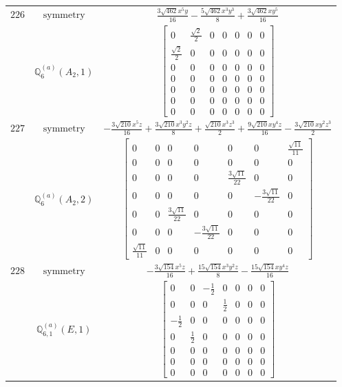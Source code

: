 \documentclass[fleqn,8pt,landscape]{jsarticle}
\begin{document}
\begin{longtable}{ccc}
$ 226 $ & $ \text{symmetry} $ & $ \frac{3 \sqrt{462} x^{5} y}{16} - \frac{5 \sqrt{462} x^{3} y^{3}}{8} + \frac{3 \sqrt{462} x y^{5}}{16} $ \\
$  $ & $ \mathbb{Q}_{6}^{(a)}(A_{2},1) $ & $ \begin{bmatrix} 0 & \frac{\sqrt{2}}{2} & 0 & 0 & 0 & 0 & 0 \\ \frac{\sqrt{2}}{2} & 0 & 0 & 0 & 0 & 0 & 0 \\ 0 & 0 & 0 & 0 & 0 & 0 & 0 \\ 0 & 0 & 0 & 0 & 0 & 0 & 0 \\ 0 & 0 & 0 & 0 & 0 & 0 & 0 \\ 0 & 0 & 0 & 0 & 0 & 0 & 0 \\ 0 & 0 & 0 & 0 & 0 & 0 & 0 \end{bmatrix} $ \\ \hline
$ 227 $ & $ \text{symmetry} $ & $ - \frac{3 \sqrt{210} x^{5} z}{16} + \frac{3 \sqrt{210} x^{3} y^{2} z}{8} + \frac{\sqrt{210} x^{3} z^{3}}{2} + \frac{9 \sqrt{210} x y^{4} z}{16} - \frac{3 \sqrt{210} x y^{2} z^{3}}{2} $ \\
$  $ & $ \mathbb{Q}_{6}^{(a)}(A_{2},2) $ & $ \begin{bmatrix} 0 & 0 & 0 & 0 & 0 & 0 & \frac{\sqrt{11}}{11} \\ 0 & 0 & 0 & 0 & 0 & 0 & 0 \\ 0 & 0 & 0 & 0 & \frac{3 \sqrt{11}}{22} & 0 & 0 \\ 0 & 0 & 0 & 0 & 0 & - \frac{3 \sqrt{11}}{22} & 0 \\ 0 & 0 & \frac{3 \sqrt{11}}{22} & 0 & 0 & 0 & 0 \\ 0 & 0 & 0 & - \frac{3 \sqrt{11}}{22} & 0 & 0 & 0 \\ \frac{\sqrt{11}}{11} & 0 & 0 & 0 & 0 & 0 & 0 \end{bmatrix} $ \\ \hline
$ 228 $ & $ \text{symmetry} $ & $ - \frac{3 \sqrt{154} x^{5} z}{16} + \frac{15 \sqrt{154} x^{3} y^{2} z}{8} - \frac{15 \sqrt{154} x y^{4} z}{16} $ \\
$  $ & $ \mathbb{Q}_{6,1}^{(a)}(E,1) $ & $ \begin{bmatrix} 0 & 0 & - \frac{1}{2} & 0 & 0 & 0 & 0 \\ 0 & 0 & 0 & \frac{1}{2} & 0 & 0 & 0 \\ - \frac{1}{2} & 0 & 0 & 0 & 0 & 0 & 0 \\ 0 & \frac{1}{2} & 0 & 0 & 0 & 0 & 0 \\ 0 & 0 & 0 & 0 & 0 & 0 & 0 \\ 0 & 0 & 0 & 0 & 0 & 0 & 0 \\ 0 & 0 & 0 & 0 & 0 & 0 & 0 \end{bmatrix} $ \\ \hline

\end{longtable}
\end{document}
